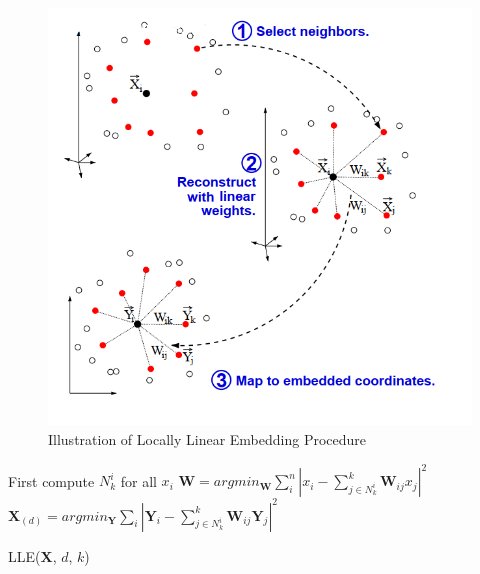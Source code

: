 \documentclass[12pt]{report}
\begin{document}
\begin{figure}[ht]
    \begin{center}
        \includegraphics[scale=0.55]{LLE.png}
        \caption{Illustration of Locally Linear Embedding Procedure}
        \label{fig:Illustration of LLE Process}
    \end{center}
\end{figure}
\begin{algorithm}
    First compute $N^i_k$ for all $x_i$\;
    $\mathbf{W} = argmin_{\mathbf{W}}\sum_i^n|x_i - \sum_{j \in N^i_k}^k \mathbf{W}_{ij} x_j|^2$\;
    $\mathbf{X}_{(d)} = argmin_{\mathbf{Y}}\sum_i |\mathbf{Y}_i - \sum_{j \in N^i_k}^k \mathbf{W}_{ij}\mathbf{Y}_j|^2$\;
    \caption{LLE($\mathbf{X}$, $d$, $k$)}
\end{algorithm}
\end{document}
